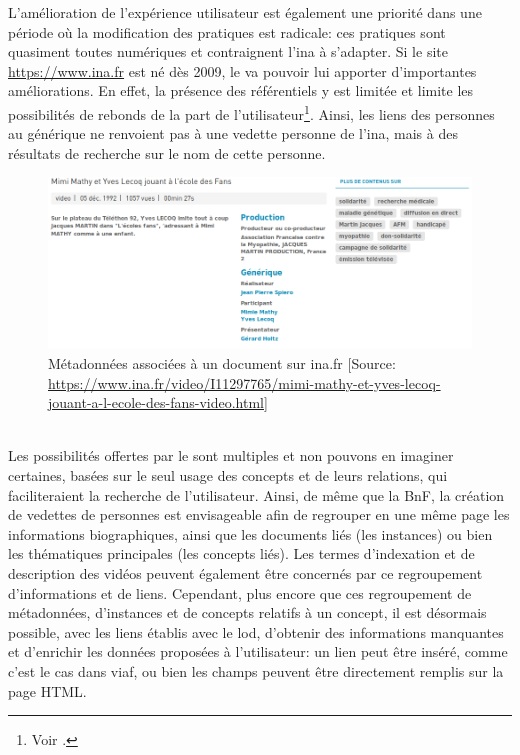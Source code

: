 L'amélioration de l'expérience utilisateur est également une priorité dans une période où la modification des pratiques est radicale: ces pratiques sont quasiment toutes numériques et contraignent l'\ac{ina} à s'adapter. Si le site \url{https://www.ina.fr} est né dès 2009, le \ldd va pouvoir lui apporter d'importantes améliorations. En effet, la présence des référentiels y est limitée et limite les possibilités de rebonds de la part de l'utilisateur\footnote{Voir .}. Ainsi, les liens des personnes au générique ne renvoient pas à une vedette personne de l'\ac{ina}, mais à des résultats de recherche sur le nom de cette personne. 
\begin{figure}[!h]
	\centering
	\includegraphics[width=13cm]{images/inafr_ecole_fans.png}
	\caption[Métadonnées associées à un document sur ina.fr]{Métadonnées associées à un document sur ina.fr [Source: \url{https://www.ina.fr/video/I11297765/mimi-mathy-et-yves-lecoq-jouant-a-l-ecole-des-fans-video.html}]}
	\label{inafr_result}
\end{figure}\\
Les possibilités offertes par le \ldd sont multiples et non pouvons en imaginer certaines, basées sur le seul usage des concepts et de leurs relations, qui faciliteraient la recherche de l'utilisateur. Ainsi, de même que la BnF, la création de vedettes de personnes est envisageable afin de regrouper en une même page les informations biographiques, ainsi que les documents liés (les instances) ou bien les thématiques principales (les concepts liés). Les termes d'indexation et de description des vidéos peuvent également être concernés par ce regroupement d'informations et de liens. Cependant, plus encore que ces regroupement de métadonnées, d'instances et de concepts relatifs à un concept, il est désormais possible, avec les liens établis avec le \ac{lod}, d'obtenir des informations manquantes et d'enrichir les données proposées à l'utilisateur: un lien peut être inséré, comme c'est le cas dans \ac{viaf}, ou bien les champs peuvent être directement remplis sur la page HTML.\\

